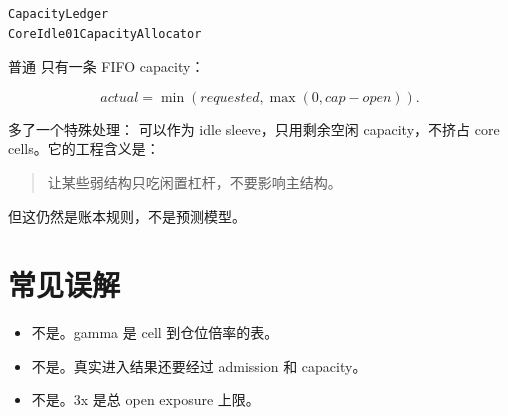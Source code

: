 \begin{lstlisting}
CapacityLedger
CoreIdle01CapacityAllocator
\end{lstlisting}

普通  只有一条 FIFO capacity：

\[
actual = \min(requested,\max(0,cap-open)).
\]

 多了一个特殊处理： 可以作为 idle sleeve，只用剩余空闲 capacity，不挤占 core cells。它的工程含义是：

\begin{quote}
让某些弱结构只吃闲置杠杆，不要影响主结构。
\end{quote}

但这仍然是账本规则，不是预测模型。

\section{常见误解}

\begin{itemize}[leftmargin=2em]
  \item {}不是。gamma 是 cell 到仓位倍率的表。
  \item {}不是。真实进入结果还要经过 admission 和 capacity。
  \item {}不是。3x 是总 open exposure 上限。
\end{itemize}


